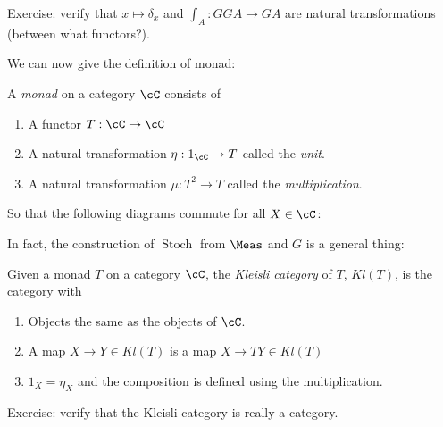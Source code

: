 \documentclass{article}
\DeclareMathOperator{\Stoch}{Stoch}
\begin{document}
Exercise: verify that $x \mapsto \delta_x$ and $\int_A: GGA \to GA$ are natural transformations (between what functors?).

We can now give the definition of monad:
\begin{definition}
    A \emph{monad} on a category $\cC$ consists of
    \begin{enumerate}
        \item A functor $T: \cC \to \cC$
        \item A natural transformation $\eta: 1_\cC \to T$ called the \emph{unit}.
        \item A natural transformation $\mu: T^2 \to T$ called the \emph{multiplication}.
    \end{enumerate}
    So that the following diagrams commute for all $X \in \cC$:


\end{definition}

In fact, the construction of $\Stoch$ from $\Meas$ and $G$ is a general thing:

\begin{definition}
    Given a monad $T$ on a category $\cC$, the \emph{Kleisli category} of $T$, $Kl(T)$, is the category with
    \begin{enumerate}
        \item Objects the same as the objects of $\cC$.
        \item A map $X \to Y \in Kl(T)$ is a map $X \to TY \in Kl(T)$
        \item $1_X = \eta_X$ and the composition is defined using the multiplication.
    \end{enumerate}
\end{definition}

Exercise: verify that the Kleisli category is really a category.
\end{document}
